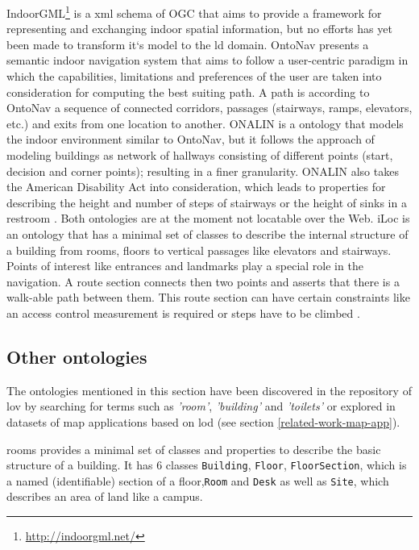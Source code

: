 \documentclass[draft,final]{vutinfth} %
\begin{document}
IndoorGML\footnote{\url{http://indoorgml.net/}} is a \gls{xml} schema of OGC that aims to provide a framework for representing and exchanging indoor spatial information, but no efforts has yet been made to transform it`s model to the \gls{ld} domain. OntoNav presents a semantic indoor navigation system that aims to follow a user-centric paradigm in which the capabilities, limitations and preferences of the user are taken into consideration for computing the best suiting path. A path is according to OntoNav a sequence of connected corridors, passages (stairways, ramps, elevators, etc.) and exits from one location to another\cite{anagnostopoulos_ontonav:_2005}. ONALIN is a ontology that models the indoor environment similar to OntoNav, but it follows the approach of modeling buildings as network of hallways consisting of different points (start, decision and corner points); resulting in a finer granularity. ONALIN also takes the American Disability Act into consideration, which leads to properties for describing the height and number of steps of stairways or the height of sinks in a restroom \cite{dudas_onalin:_2009}. Both ontologies are at the moment not locatable over the Web. iLoc is an ontology that has a minimal set of classes to describe the internal structure of a building from rooms, floors to vertical passages like elevators and stairways. Points of interest like entrances and landmarks play a special role in the navigation. A route section connects then two points and asserts that there is a walk-able path between them. This route section can have certain constraints like an access control measurement is required or steps have to be climbed \cite{szasz_ilocbuilding_2010}.


\subsection{Other ontologies}
\label{related-work-indoor-modelling-other-ontologies}
The ontologies mentioned in this section have been discovered in the repository of \gls{lov} by searching for terms such as \textit{'room'}, \textit{'building'} and \textit{'toilets'} or explored in datasets of map applications based on \gls{lod} (see section \ref{related-work-map-app}).

\gls{rooms} provides a minimal set of classes and properties to describe the basic structure of a building. It has 6 classes \texttt{Building}, \texttt{Floor}, \texttt{FloorSection}, which is a named (identifiable) section of a floor,\texttt{Room} and \texttt{Desk} as well as \texttt{Site}, which describes an area of land like a campus.
\end{document}
